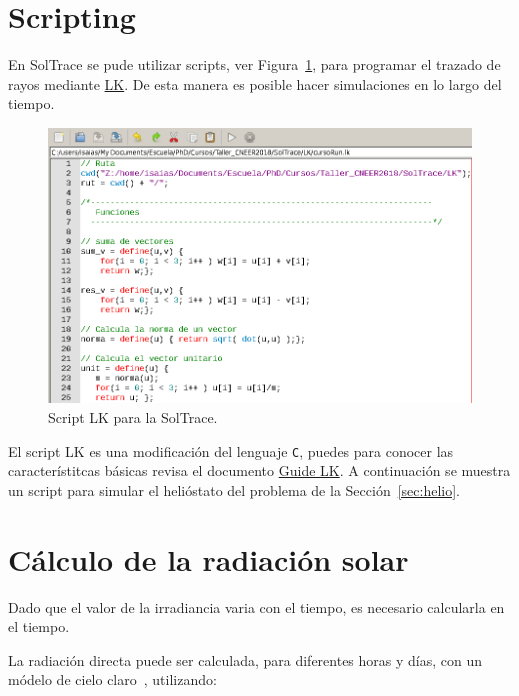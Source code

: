 \section{Scripting}
\label{sec:script}

En SolTrace se pude utilizar scripts, ver Figura~\ref{fig:script}, para programar el trazado de rayos mediante \href{https://github.com/NREL/lk}{LK}. De esta manera es posible hacer simulaciones en lo largo del tiempo.


\begin{figure}[ht]
  \centering
  \includegraphics[width=1.0\textwidth]{figures/script}
  \caption{\label{fig:script} Script LK para la SolTrace.}
\end{figure}

El script LK es una modificación del lenguaje \verb=C=, puedes para conocer las característitcas básicas revisa el documento \href{https://github.com/NREL/lk/blob/develop/doc/lk_guide.pdf}{Guide LK}. A continuación se muestra un script para simular el helióstato del problema de la Sección~\ref{sec:helio}.




\section{Cálculo de la radiación solar}
\label{sec:radiacion}

Dado que el valor de la irradiancia varia con el tiempo, es necesario calcularla en el tiempo.


La radiación directa puede ser calculada, para diferentes horas y días, con un módelo de cielo claro~\citep{Dunham2013optical}, utilizando:

